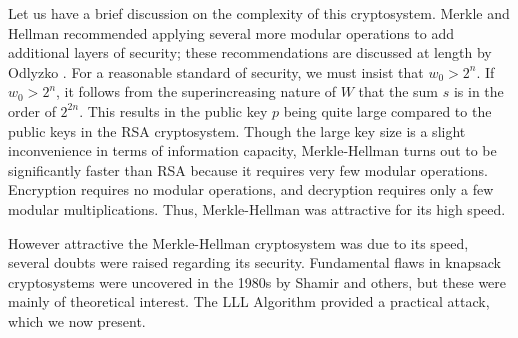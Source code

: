 \documentclass[a4paper,12pt]{article}
\begin{document}
Let us have a brief discussion on the complexity of this cryptosystem. Merkle and Hellman recommended applying several more modular operations to add additional layers of security; these recommendations are discussed at length by Odlyzko \cite{Odlyzko}. For a reasonable standard of security, we must insist that $w_0 > 2^n$. If $w_0 > 2^n$, it follows from the superincreasing nature of $W$ that the sum $s$ is in the order of $2^{2n}$. This results in the public key $p$ being quite large compared to the public keys in the RSA cryptosystem. Though the large key size is a slight inconvenience in terms of information capacity, Merkle-Hellman turns out to be significantly faster than RSA because it requires very few modular operations. Encryption requires no modular operations, and decryption requires only a few modular multiplications. Thus, Merkle-Hellman was attractive for its high speed.

However attractive the Merkle-Hellman cryptosystem was due to its speed, several doubts were raised regarding its security. Fundamental flaws in knapsack cryptosystems were uncovered in the 1980s by Shamir \cite{Shamir} and others, but these were mainly of theoretical interest. The LLL Algorithm provided a practical attack, which we now present.
\end{document}
